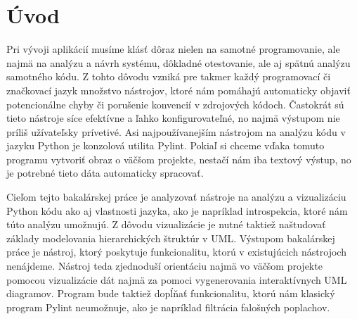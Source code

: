 \documentclass[11pt,oneside,final]{fithesis2}
\begin{document}
 \FrontMatter  
 \ThesisTitlePage

\begin{ThesisDeclaration}
\DeclarationText
\AdvisorName
\end{ThesisDeclaration}

\begin{ThesisThanks}
\end{ThesisThanks}

\begin{ThesisAbstract}
\end{ThesisAbstract}

\begin{ThesisKeyWords}
\end{ThesisKeyWords}



\MainMatter  
\tableofcontents

\chapter{Úvod}

	Pri vývoji aplikácií musíme klásť dôraz nielen na samotné programovanie, ale najmä na analýzu a návrh systému, dôkladné otestovanie, ale aj spätnú analýzu samotného kódu. Z tohto dôvodu vzniká pre takmer každý programovací či značkovací jazyk množstvo nástrojov, ktoré nám pomáhajú automaticky objaviť potencionálne chyby či porušenie konvencií v zdrojových kódoch. Častokrát sú tieto nástroje síce efektívne a ľahko konfigurovateľné, no najmä výstupom nie príliš užívateľsky prívetivé. Asi najpoužívanejším nástrojom na analýzu kódu v jazyku Python je konzolová utilita Pylint. Pokiaľ si chceme vďaka tomuto programu vytvoriť obraz o väčšom projekte, nestačí nám iba textový výstup, no je potrebné tieto dáta automaticky spracovať.
	
	Cieľom tejto bakalárskej práce je analyzovať nástroje na analýzu a vizualizáciu Python kódu ako aj vlastnosti jazyka, ako je napríklad introspekcia, ktoré nám túto analýzu umožnujú. Z dôvodu vizualizácie je nutné taktiež naštudovať základy modelovania hierarchických štruktúr v UML. Výstupom bakalárskej práce je nástroj, ktorý poskytuje funkcionalitu, ktorú v existujúcich nástrojoch nenájdeme. Nástroj teda zjednoduší orientáciu najmä vo väčšom projekte pomocou vizualizácie dát najmä za pomoci vygenerovania interaktívnych UML diagramov. Program bude taktiež dopĺňať funkcionalitu, ktorú nám klasický program Pylint neumožnuje, ako je napríklad filtrácia falošných poplachov. 
\end{document}
